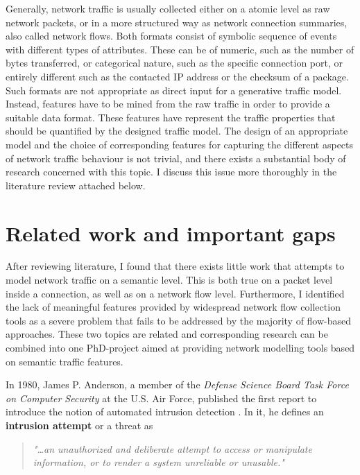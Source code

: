 \documentclass[a4paper,12pt,twoside]{report}
\begin{document}
Generally, network traffic is usually collected either on a atomic level as raw network packets, or in a more structured way as network connection summaries, also called network flows. Both formats consist of symbolic sequence of events with different types of attributes. These can be of numeric, such as the number of bytes transferred, or categorical nature, such as the specific connection port, or entirely different such as the contacted IP address or the checksum of a package. Such formats are not appropriate as direct input for a generative traffic model. Instead, features have to be mined from the raw traffic in order to provide a suitable data format. These features have represent the traffic properties that should be quantified by the designed traffic model. The design of an appropriate model and the choice of corresponding features for capturing the different aspects of network traffic behaviour is not trivial, and there exists a substantial body of research concerned with this topic. I discuss this issue more thoroughly in the literature review attached below.




\section{Related work and important gaps}


After reviewing literature, I found that there exists little work that attempts to model network traffic on a semantic level. This is both true on a packet level inside a connection, as well as on a network flow level. Furthermore, I identified the lack of meaningful features provided by widespread network flow collection tools as a severe problem that fails to be addressed by the majority of flow-based approaches. These two topics are related and corresponding research can be combined into one PhD-project aimed at providing network modelling tools based on semantic traffic features.





In 1980, James P. Anderson, a member of the \textit{Defense Science Board Task Force on Computer Security} at the U.S. Air Force, published the first report to introduce the notion of automated intrusion detection \cite{anderson1980computer}. In it, he defines an \textbf{intrusion attempt} or a threat as 

\begin{quote}
\textit{"\dots an unauthorized and deliberate attempt to access or manipulate information, or to render a system unreliable or unusable."}
\end{quote}
\end{document}
